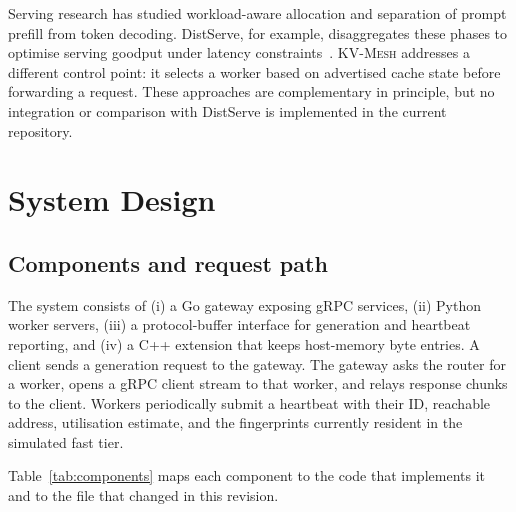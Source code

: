 \documentclass[10pt,twocolumn]{article}
\newcommand{\kvmesh}{\textsc{KV-Mesh}}
\begin{document}
Serving research has studied workload-aware allocation and separation of prompt
prefill from token decoding. DistServe, for example, disaggregates these phases
to optimise serving goodput under latency constraints~\cite{distserve}.
\kvmesh{} addresses a different control point: it selects a worker based on
advertised cache state before forwarding a request. These approaches are
complementary in principle, but no integration or comparison with DistServe is
implemented in the current repository.

\section{System Design}

\subsection{Components and request path}

The system consists of (i) a Go gateway exposing gRPC services, (ii) Python
worker servers, (iii) a protocol-buffer interface for generation and heartbeat
reporting, and (iv) a C++ extension that keeps host-memory byte entries. A
client sends a generation request to the gateway. The gateway asks the router
for a worker, opens a gRPC client stream to that worker, and relays response
chunks to the client. Workers periodically submit a heartbeat with their ID,
reachable address, utilisation estimate, and the fingerprints currently
resident in the simulated fast tier.

Table~\ref{tab:components} maps each component to the code that implements it
and to the file that changed in this revision.
\end{document}
